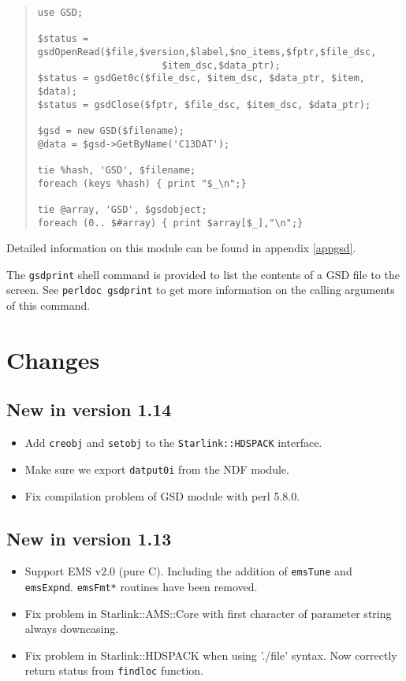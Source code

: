 \documentclass[twoside,11pt]{article}
\newenvironment{myquote}{\begin{quote}\begin{small}}{\end{small}\end{quote}}
\renewcommand{\_}{\texttt{\symbol{95}}}
\begin{document}
\begin{myquote}
\begin{verbatim}
use GSD;

$status = gsdOpenRead($file,$version,$label,$no_items,$fptr,$file_dsc,
                      $item_dsc,$data_ptr);
$status = gsdGet0c($file_dsc, $item_dsc, $data_ptr, $item, $data);
$status = gsdClose($fptr, $file_dsc, $item_dsc, $data_ptr);

$gsd = new GSD($filename);
@data = $gsd->GetByName('C13DAT');

tie %hash, 'GSD', $filename;
foreach (keys %hash) { print "$_\n";}

tie @array, 'GSD', $gsdobject;
foreach (0.. $#array) { print $array[$_],"\n";}
\end{verbatim}
\end{myquote}

Detailed information on this module can be found in appendix \ref{appgsd}.

The \texttt{gsdprint} shell command is provided to list the contents
of a GSD file to the screen. See \texttt{perldoc gsdprint} to get more
information on the calling arguments of this command.

\appendix

\section{Changes}

\subsection{New in version 1.14}

\begin{itemize}
\item Add \texttt{creobj} and \texttt{setobj} to the
  \texttt{Starlink::HDSPACK} interface.
\item Make sure we export \texttt{dat\_put0i} from the NDF module.
\item Fix compilation problem of GSD module with perl 5.8.0.
\end{itemize}

\subsection{New in version 1.13}

\begin{itemize}
\item Support EMS v2.0 (pure C). Including the addition of \texttt{emsTune}
  and \texttt{emsExpnd}. \texttt{emsFmt*} routines have been removed.
\item Fix problem in Starlink::AMS::Core with first character of parameter
  string always downcasing.
\item Fix problem in Starlink::HDSPACK when using './file' syntax. Now
  correctly return status from \texttt{\_find\_loc} function.
\end{itemize}
\end{document}
